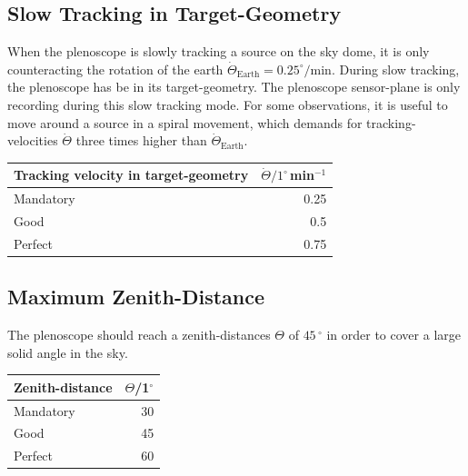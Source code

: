 \documentclass[11pt,a4paper,oneside,titlepage]{article}
\begin{document}
\subsection{Slow Tracking in Target-Geometry}
%
When the plenoscope is slowly tracking a source on the sky dome, it is only counteracting the rotation of the earth \mbox{$\dot{\Theta}_\text{Earth} = 0.25^\circ/$min}.
%
During slow tracking, the plenoscope has be in its target-geometry.
%
The plenoscope sensor-plane is only recording during this slow tracking mode.
%
For some observations, it is useful to move around a source in a spiral movement, which demands for tracking-velocities $\dot{\Theta}$ three times higher than $\dot{\Theta}_\text{Earth}$.
%
\begin{table}[H]
    \begin{center}
        \begin{tabular}{lr}
            Tracking velocity in target-geometry & $\dot{\Theta}/1^\circ$\,min$^{-1}$\\
            \toprule
            Mandatory & 0.25\\
            Good      & 0.5\\
            Perfect   & 0.75\\
            \bottomrule
        \end{tabular}
    \end{center}
\end{table}
\subsection{Maximum Zenith-Distance}
%
The plenoscope should reach a zenith-distances $\Theta$ of $45\,^\circ$ in order to cover a large solid angle in the sky.
%
\begin{table}[H]
    \begin{center}
        \begin{tabular}{lr}
            Zenith-distance & $\Theta$/1$^\circ$\\
            \toprule
            Mandatory & 30\\
            Good      & 45\\
            Perfect   & 60\\
            \bottomrule
        \end{tabular}
    \end{center}
\end{table}
\end{document}
